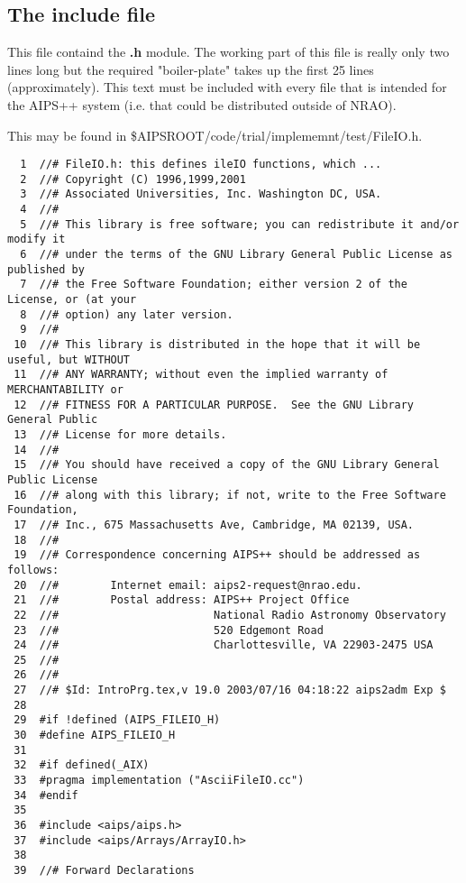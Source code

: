 \newpage
\subsection{The {\bf include} file}

        This file containd the {\bf .h} module.         The working part of
this file is really only two lines long but the required
"boiler-plate" takes up the first 25 lines (approximately). This text
must be included with every file that is intended for the AIPS++
system (i.e. that could be distributed outside of NRAO).  



\newpage

This 
may be found in \$AIPSROOT/code/trial/implememnt/test/FileIO.h.
\begin{verbatim}
  1  //# FileIO.h: this defines ileIO functions, which ...
  2  //# Copyright (C) 1996,1999,2001
  3  //# Associated Universities, Inc. Washington DC, USA.
  4  //#
  5  //# This library is free software; you can redistribute it and/or modify it
  6  //# under the terms of the GNU Library General Public License as published by
  7  //# the Free Software Foundation; either version 2 of the License, or (at your
  8  //# option) any later version.
  9  //#
 10  //# This library is distributed in the hope that it will be useful, but WITHOUT
 11  //# ANY WARRANTY; without even the implied warranty of MERCHANTABILITY or
 12  //# FITNESS FOR A PARTICULAR PURPOSE.  See the GNU Library General Public
 13  //# License for more details.
 14  //#
 15  //# You should have received a copy of the GNU Library General Public License
 16  //# along with this library; if not, write to the Free Software Foundation,
 17  //# Inc., 675 Massachusetts Ave, Cambridge, MA 02139, USA.
 18  //#
 19  //# Correspondence concerning AIPS++ should be addressed as follows:
 20  //#        Internet email: aips2-request@nrao.edu.
 21  //#        Postal address: AIPS++ Project Office
 22  //#                        National Radio Astronomy Observatory
 23  //#                        520 Edgemont Road
 24  //#                        Charlottesville, VA 22903-2475 USA
 25  //#
 26  //#
 27  //# $Id: IntroPrg.tex,v 19.0 2003/07/16 04:18:22 aips2adm Exp $
 28
 29  #if !defined (AIPS_FILEIO_H)
 30  #define AIPS_FILEIO_H
 31
 32  #if defined(_AIX)
 33  #pragma implementation ("AsciiFileIO.cc")
 34  #endif
 35
 36  #include <aips/aips.h>
 37  #include <aips/Arrays/ArrayIO.h>
 38
 39  //# Forward Declarations

\end{verbatim}
